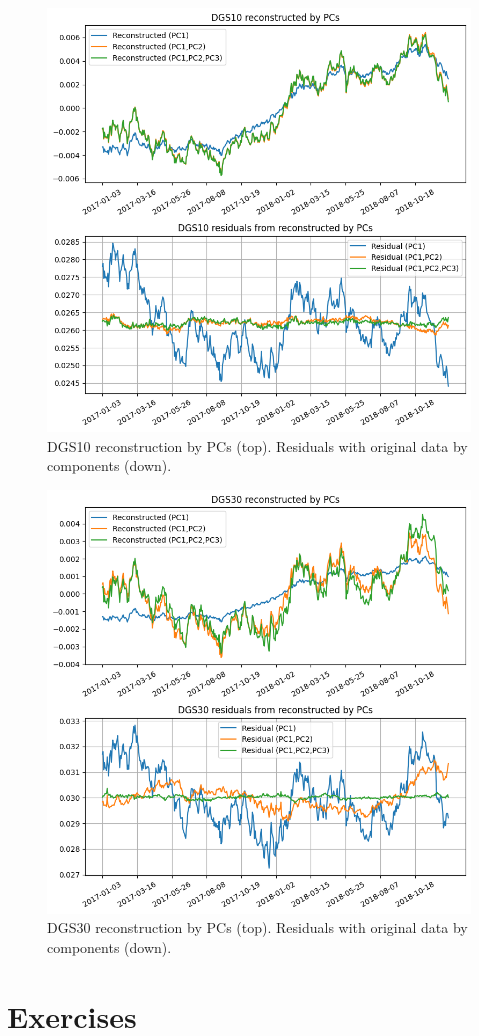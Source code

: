 \begin{figure}[hp]
	\centering
	\includegraphics[width=0.7\linewidth]{figures/dgs10_reco}
	\caption{DGS10 reconstruction by PCs (top). Residuals with original data by components (down).}
	\label{fig:pca_dsg10}
\end{figure}

\begin{figure}[hp]
	\centering
	\includegraphics[width=0.7\linewidth]{figures/dgs30_reco}
	\caption{DGS30 reconstruction by PCs (top). Residuals with original data by components (down).}
	\label{fig:pca_dsg30}
\end{figure}

\newpage
\section*{Exercises}

